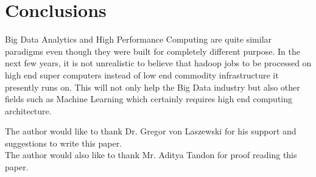 \documentclass[sigconf]{acmart}
\begin{document}
\section{Conclusions}

Big Data Analytics and High Performance Computing are quite similar paradigms even though they were built for completely different purpose. In the next few years, it is not unrealistic to believe that hadoop jobs to be processed on high end super computers instead of low end commodity infrastructure it presently runs on. This will not only help the Big Data industry but also other fields such as Machine Learning which certainly requires high end computing architecture. 


\appendix

\begin{acks}

 The author would like to thank Dr. Gregor von Laszewski for his support and suggestions to write this paper.
 \\
 The author would also like to thank Mr. Aditya Tandon for proof reading this paper.
\\
\end{acks}


 

% 
\end{document}
